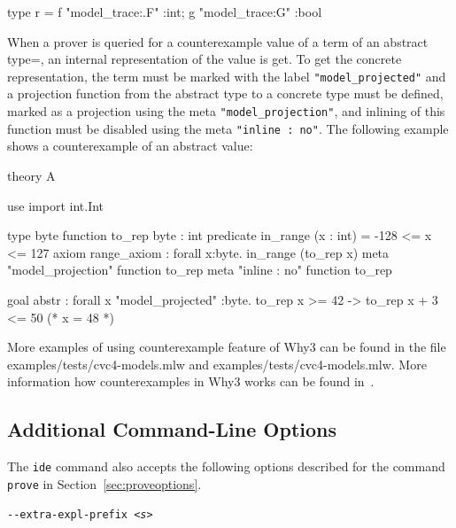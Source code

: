 \begin{whycode}
  type r = {f "model_trace:.F" :int; g "model_trace:G" :bool}
\end{whycode}

When a prover is queried for a counterexample value of a term of an abstract
type=, an internal representation of the value is get. To get the concrete
representation, the term must be marked with the label
\texttt{"model\_projected"} and a projection function from the abstract type
to a concrete type must be defined, marked as a projection using the meta
\texttt{"model\_projection"}, and inlining of this function must be disabled
using the meta \texttt{"inline : no"}. The following example shows a
counterexample of an abstract value:

\begin{whycode}
  theory A

    use import int.Int

    type byte
    function to_rep byte : int
    predicate in_range (x : int) = -128 <= x <= 127
    axiom range_axiom : forall x:byte.
      in_range (to_rep x)
    meta "model_projection" function to_rep
    meta "inline : no" function to_rep

    goal abstr : forall x "model_projected" :byte. to_rep x >= 42 -> to_rep x
    + 3 <= 50
    (* x = 48 *)
\end{whycode}

More examples of using counterexample feature of Why3 can be found in the file
examples/tests/cvc4-models.mlw and examples/tests/cvc4-models.mlw.
More information how counterexamples in Why3 works can be found
in~\cite{hauzar16sefm}.

%
%
%
%
%
%

\subsection{Additional Command-Line Options}

The \texttt{ide} command also accepts the following options described for the command \texttt{prove} in Section~\ref{sec:proveoptions}.
\begin{description}
\item[\texttt{-{}-extra-expl-prefix \textsl{<s>}}]
\end{description}


